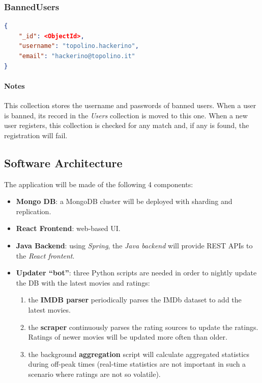 \documentclass[11pt]{article}
\begin{document}
\subsubsection{BannedUsers}
\label{sec:banned_users}

\begin{lstlisting}[language=json]	
{
	"_id": <ObjectId>,
	"username": "topolino.hackerino",
	"email": "hackerino@topolino.it"
}
\end{lstlisting}

\paragraph{Notes}
This collection stores the username and passwords of banned users. 
When a user is banned, its record in the \emph{Users} collection is moved
to this one.
When a new user registers, this collection is checked for any match and, 
if any is found, the registration will fail. 


\subsection{Software Architecture}

The application will be made of the following 4 components:
\begin{itemize}
	\item \textbf{Mongo DB}: a MongoDB cluster will be deployed with sharding and replication.
	\item \textbf{React Frontend}: web-based UI.
	\item \textbf{Java Backend}: using \emph{Spring}, the \emph{Java backend} will provide REST APIs to the \emph{React frontent}.
	\item \textbf{Updater ``bot''}: three Python scripts are needed in order to nightly update the DB with the latest movies and ratings: 
	\begin{enumerate}
		\item the \textbf{IMDB parser} periodically parses the IMDb dataset to add the latest movies.
		\item the \textbf{scraper} continuously parses the rating sources to update the ratings. Ratings of newer movies will be updated more often than older.
		\item the background \textbf{aggregation} script will calculate aggregated statistics during off-peak times (real-time statistics are not important in such a scenario where ratings are not so volatile).
	\end{enumerate}
\end{itemize}

\end{document}
